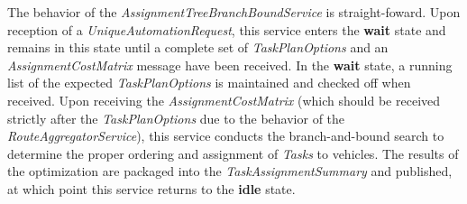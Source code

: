 The behavior of the \emph{AssignmentTreeBranchBoundService} is
straight-foward. Upon reception of a \emph{UniqueAutomationRequest},
this service enters the \textbf{wait} state and remains in this state
until a complete set of \emph{TaskPlanOptions} and an
\emph{AssignmentCostMatrix} message have been received. In the
\textbf{wait} state, a running list of the expected
\emph{TaskPlanOptions} is maintained and checked off when received. Upon
receiving the \emph{AssignmentCostMatrix} (which should be received
strictly after the \emph{TaskPlanOptions} due to the behavior of the
\emph{RouteAggregatorService}), this service conducts the
branch-and-bound search to determine the proper ordering and assignment
of \emph{Tasks} to vehicles. The results of the optimization are
packaged into the \emph{TaskAssignmentSummary} and published, at which
point this service returns to the \textbf{idle} state.

